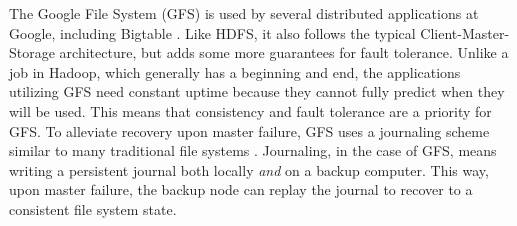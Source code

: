 The Google File System (GFS) \cite{ghemawat_sigops03} is used by several distributed applications at Google, including Bigtable \cite{chang_osdi06}.  Like HDFS, it also follows the typical Client-Master-Storage architecture, but adds some more guarantees for fault tolerance.  Unlike a job in Hadoop, which generally has a beginning and end, the applications utilizing GFS need constant uptime because they cannot fully predict when they will be used.  This means that consistency and fault tolerance are a priority for GFS.  To alleviate recovery upon master failure, GFS uses a journaling scheme similar to many traditional file systems \cite{seltzer_atc00}.  Journaling, in the case of GFS, means writing a persistent journal both locally \textit{and} on a backup computer.  This way, upon master failure, the backup node can replay the journal to recover to a consistent file system state.

